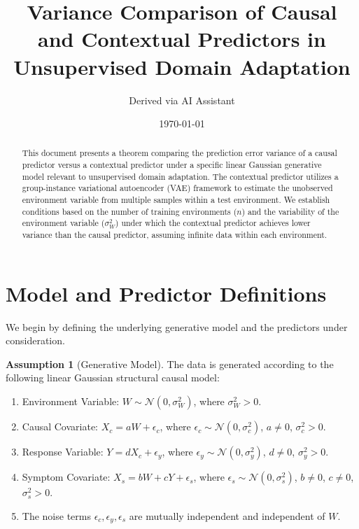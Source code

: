 \documentclass{article}
\title{Variance Comparison of Causal and Contextual Predictors in Unsupervised Domain Adaptation}
\author{Derived via AI Assistant}
\date{\today}
\theoremstyle{plain}
\theoremstyle{definition}
\newtheorem{assumption}{Assumption}[section]
\theoremstyle{remark}
\newcommand{\N}{\mathcal{N}} %
\begin{document}
\maketitle

\begin{abstract}
This document presents a theorem comparing the prediction error variance of a causal predictor versus a contextual predictor under a specific linear Gaussian generative model relevant to unsupervised domain adaptation. The contextual predictor utilizes a group-instance variational autoencoder (VAE) framework to estimate the unobserved environment variable from multiple samples within a test environment. We establish conditions based on the number of training environments ($n$) and the variability of the environment variable ($\sigma_W^2$) under which the contextual predictor achieves lower variance than the causal predictor, assuming infinite data within each environment.
\end{abstract}

\section{Model and Predictor Definitions}

We begin by defining the underlying generative model and the predictors under consideration.

\begin{assumption}[Generative Model]\label{ass:model}
The data is generated according to the following linear Gaussian structural causal model:
\begin{enumerate}
    \item Environment Variable: $W \sim \N(0, \sigma_W^2)$, where $\sigma_W^2 > 0$.
    \item Causal Covariate: $X_c = aW + \epsilon_c$, where $\epsilon_c \sim \N(0, \sigma_c^2)$, $a \neq 0$, $\sigma_c^2 > 0$.
    \item Response Variable: $Y = dX_c + \epsilon_y$, where $\epsilon_y \sim \N(0, \sigma_y^2)$, $d \neq 0$, $\sigma_y^2 > 0$.
    \item Symptom Covariate: $X_s = bW + cY + \epsilon_s$, where $\epsilon_s \sim \N(0, \sigma_s^2)$, $b \neq 0$, $c \neq 0$, $\sigma_s^2 > 0$.
    \item The noise terms $\epsilon_c, \epsilon_y, \epsilon_s$ are mutually independent and independent of $W$.
\end{enumerate}
\end{assumption}
\end{document}
